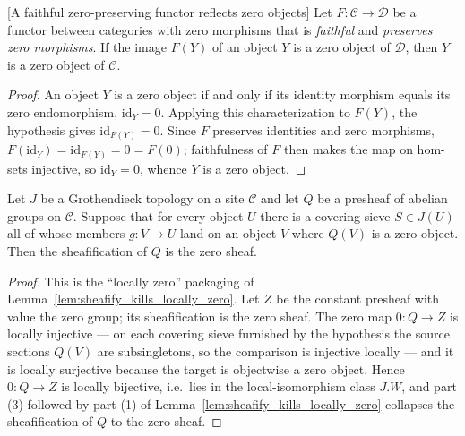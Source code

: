 \begin{lemma}

[A faithful zero-preserving functor reflects zero objects]
  \label{lem:isZero_of_faithful_preservesZeroMorphisms}
  Let \(F : \mathcal{C} \to \mathcal{D}\) be a functor between categories with zero
  morphisms that is \emph{faithful} and \emph{preserves zero morphisms}. If the image
  \(F(Y)\) of an object \(Y\) is a zero object of \(\mathcal{D}\), then \(Y\) is a zero
  object of \(\mathcal{C}\).
\end{lemma}
\begin{proof}

  An object \(Y\) is a zero object if and only if its identity morphism equals its zero
  endomorphism, \(\mathrm{id}_Y = 0\). Applying this characterization to \(F(Y)\), the
  hypothesis gives \(\mathrm{id}_{F(Y)} = 0\). Since \(F\) preserves identities and zero
  morphisms, \(F(\mathrm{id}_Y) = \mathrm{id}_{F(Y)} = 0 = F(0)\); faithfulness of \(F\)
  then makes the map on hom-sets injective, so \(\mathrm{id}_Y = 0\), whence \(Y\) is a
  zero object.
\end{proof}

\begin{lemma}\leanok
  \label{lem:isZero_presheafToSheaf_of_locally_isZero}
  Let \(J\) be a Grothendieck topology on a site \(\mathcal{C}\) and let \(Q\) be a
  presheaf of abelian groups on \(\mathcal{C}\). Suppose that for every object \(U\) there
  is a covering sieve \(S \in J(U)\) all of whose members \(g : V \to U\) land on an object
  \(V\) where \(Q(V)\) is a zero object. Then the sheafification of \(Q\) is the zero
  sheaf.
\end{lemma}
\begin{proof}
  \leanok
  This is the ``locally zero'' packaging of
  Lemma~\ref{lem:sheafify_kills_locally_zero}. Let \(Z\) be the constant presheaf with
  value the zero group; its sheafification is the zero sheaf. The zero map \(0 : Q \to Z\)
  is locally injective --- on each covering sieve furnished by the hypothesis the source
  sections \(Q(V)\) are subsingletons, so the comparison is injective locally --- and it
  is locally surjective because the target is objectwise a zero object. Hence
  \(0 : Q \to Z\) is locally bijective, i.e.\ lies in the local-isomorphism class
  \(J.W\), and part (3) followed by part (1) of
  Lemma~\ref{lem:sheafify_kills_locally_zero} collapses the sheafification of \(Q\) to the
  zero sheaf.
\end{proof}

